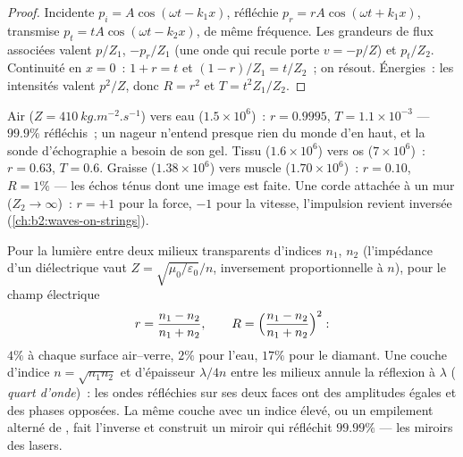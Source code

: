 \begin{proof}
Incidente $p_i = A\cos(\omega t - k_1x)$, réfléchie $p_r = rA\cos(\omega t + k_1x)$,
transmise $p_t = tA\cos(\omega t - k_2x)$, de même fréquence. Les grandeurs de flux
associées valent $p/Z_1$, $-p_r/Z_1$ (une onde qui recule porte
$v = -p/Z$) et $p_t/Z_2$. Continuité en $x = 0$~: $1 + r = t$ et $(1 - r)/Z_1
= t/Z_2$~; on résout. Énergies~: les intensités valent $p^2/Z$, donc $R = r^2$ et
$T = t^2Z_1/Z_2$.
\end{proof}

\begin{example}\label{ex:b2:wave-interfaces:sound}
Air ($Z = \qty{410}{kg.m^{-2}.s^{-1}}$) vers eau ($1.5 \times 10^6$)~: $r = 0.9995$,
$T = 1.1 \times 10^{-3}$ --- $99.9\%$ réfléchis~; un nageur n'entend presque rien
du monde d'en haut, et la sonde d'échographie a besoin de son gel. Tissu
($1.6 \times 10^6$) vers os ($7 \times 10^6$)~: $r = 0.63$, $T = 0.6$. Graisse ($1.38 \times
10^6$) vers muscle ($1.70 \times 10^6$)~: $r = 0.10$, $R = 1\%$ --- les échos ténus dont une
image est faite. Une corde attachée à un mur ($Z_2 \to \infty$)~: $r = +1$ pour la
force, $-1$ pour la vitesse, l'impulsion revient inversée
(\cref{ch:b2:waves-on-strings}).
\end{example}

\begin{proposition}\label{prop:b2:wave-interfaces:optics}
Pour la lumière entre deux milieux transparents d'indices $n_1$, $n_2$ (l'impédance
d'un diélectrique vaut $Z = \sqrt{\mu_0/\varepsilon_0}/n$, inversement
proportionnelle à $n$), pour le champ électrique
\[
r = \frac{n_1 - n_2}{n_1 + n_2} , \qquad R = \Bigl(\frac{n_1 - n_2}{n_1 + n_2}\Bigr)^2 :
\]
$4\%$ à chaque surface air--verre, $2\%$ pour l'eau, $17\%$ pour le diamant. Une
couche d'indice $n = \sqrt{n_1n_2}$ et d'épaisseur $\lambda/4n$ entre les milieux
annule la réflexion à $\lambda$ (\emph{ quart
d'onde})~: les ondes réfléchies sur ses deux faces ont des amplitudes égales
et des phases opposées. La même couche avec un indice élevé, ou un empilement
alterné de , fait l'inverse et construit un
miroir qui réfléchit $99.99\%$ --- les miroirs des lasers.
\end{proposition}

